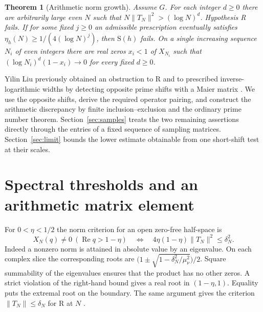 \documentclass[11pt,a4paper]{article}
\newtheorem{theorem}{Theorem}[section]
\DeclareMathOperator{\Rea}{Re}
\begin{document}
\begin{theorem}[Arithmetic norm growth]\label{th:growth}
Assume $G$. For each integer $d\ge0$ there are arbitrarily large even $N$ such that $N\|T_N\|^2>(\log N)^d$. Hypothesis R fails. If for some fixed $j\ge0$ an admissible prescription eventually satisfies
$\eta_h(N)\ge 1/(4(\log N)^j)$, then $\mathrm S(h)$ fails. On a single increasing sequence $N_i$ of even integers there are real zeros $x_i<1$ of $X_{N_i}$ such that $(\log N_i)^d(1-x_i)\to0$ for every fixed $d\ge0$.
\end{theorem}

Yilin Liu previously obtained an obstruction to R and to prescribed inverse-logarithmic widths by detecting opposite prime shifts with a Maier matrix \cite{YL}. We use the opposite shifts, derive the required operator pairing, and construct the arithmetic discrepancy by finite inclusion--exclusion and the ordinary prime number theorem. Section~\ref{sec:samples} treats the two remaining assertions directly through the entries of a fixed sequence of sampling matrices. Section~\ref{sec:limit} bounds the lower estimate obtainable from one short-shift test at their scales.

\section{Spectral thresholds and an arithmetic matrix element}\label{sec:entry}

For $0<\eta<1/2$ the norm criterion for an open zero-free half-space is
\begin{equation}\label{eq:dict}
 X_N(q)\ne0\ (\Rea q>1-\eta)
 \quad\Longleftrightarrow\quad
 4\eta(1-\eta)\|T_N\|^2\le\delta_N^2 .
\end{equation}
Indeed a nonzero norm is attained in absolute value by an eigenvalue. On each complex slice the corresponding roots are
$\bigl(1\pm\sqrt{1-\delta_N^2/\mu_\nu^2}\bigr)/2$.
Square summability of the eigenvalues ensures that the product has no other zeros. A strict violation of the right-hand bound gives a real root in $(1-\eta,1)$. Equality puts the extremal root on the boundary. The same argument gives the criterion $\|T_N\|\le\delta_N$ for R at $N$ \cite[Theorem 6.1]{LL}.
\end{document}
